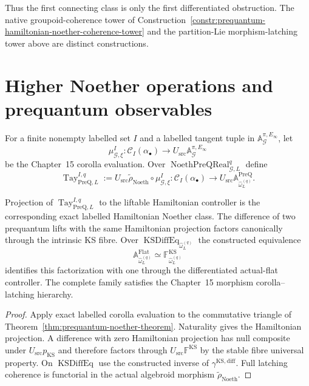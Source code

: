 Thus the first connecting class is only the first differentiated obstruction.
The native groupoid-coherence tower of
Construction~\ref{constr:prequantum-hamiltonian-noether-coherence-tower} and the
partition-Lie morphism-latching tower above are distinct constructions.

\section{Higher Noether operations and prequantum observables}
\label{sec:prequantum-higher-noether-operations}

\begin{construction}
\label{constr:prequantum-exact-labelled-noether-class}
For a finite nonempty labelled set $I$ and a labelled tangent tuple in
$\mathbb A_{\mathcal G}^{\pi,E_\infty}$, let
\[
\mu^I_{\mathcal G,\xi}:
\mathcal C_I(\alpha_\bullet)
\longrightarrow
U_{\mathrm{src}}\mathbb A_{\mathcal G}^{\pi,E_\infty}
\]
be the Chapter~15 corolla evaluation.  Over
$\operatorname{NoethPreQReal}_{\mathcal G,L}^{q}$ define
\[
\boxed{
\operatorname{Tay}^{I,q}_{\mathrm{PreQ},L}
:=
U_{\mathrm{src}}\widetilde\rho_{\mathrm{Noeth}}
\circ
\mu^I_{\mathcal G,\xi}:
\mathcal C_I(\alpha_\bullet)
\longrightarrow
U_{\mathrm{src}}\mathbb A_{\widehat\omega_L^{(q)}}^{\mathrm{PreQ}}.
}
\]
\end{construction}

\begin{theorem}
\label{thm:prequantum-compatibility-noether-hierarchy}
Projection of
$\operatorname{Tay}^{I,q}_{\mathrm{PreQ},L}$ to the liftable Hamiltonian controller
is the corresponding exact labelled Hamiltonian Noether class.  The difference of
two prequantum lifts with the same Hamiltonian projection factors canonically
through the intrinsic KS fibre.  Over
$\operatorname{KSDiffEq}_{\widehat\omega_L^{(q)}}$ the constructed equivalence
\[
\mathbb A_{\widehat\omega_L^{(q)}}^{\mathrm{Flat}}
\simeq
\mathbb F_{\widehat\omega_L^{(q)}}^{\mathrm{KS}}
\]
identifies this factorization with one through the differentiated actual-flat
controller.  The complete family satisfies the Chapter~15 morphism
corolla--latching hierarchy.
\end{theorem}

\begin{proof}
Apply exact labelled corolla evaluation to the commutative triangle of
Theorem~\ref{thm:prequantum-noether-theorem}.  Naturality gives the Hamiltonian
projection.  A difference with zero Hamiltonian projection has null composite
under $U_{\mathrm{src}}p_{\mathrm{KS}}$ and therefore factors through
$U_{\mathrm{src}}\mathbb F^{\mathrm{KS}}$ by the stable fibre universal property.  On
$\operatorname{KSDiffEq}$ use the constructed inverse of
$\gamma^{\mathrm{KS,diff}}$.  Full latching coherence is functorial in the actual
algebroid morphism $\widetilde\rho_{\mathrm{Noeth}}$.
\end{proof}


